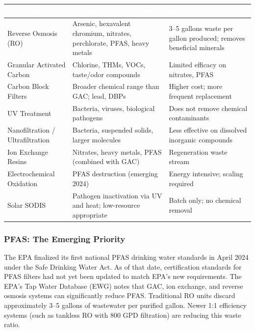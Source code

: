 \documentclass[11pt,letterpaper]{article}
\newcommand{\tableheader}[1]{\textbf{\sffamily\textcolor{white}{#1}}}
\begin{document}
\begin{center}
\begin{tabularx}{\textwidth}{L{3.5cm}XL{3cm}}
\toprule
{}
\tableheader{Technology} & \tableheader{Contaminants Addressed} & \tableheader{Key Limitation} \\
\midrule
Reverse Osmosis (RO) & Arsenic, hexavalent chromium, nitrates, perchlorate, PFAS, heavy metals & 3--5 gallons waste per gallon produced; removes beneficial minerals \\
Granular Activated Carbon & Chlorine, THMs, VOCs, taste/odor compounds & Limited efficacy on nitrates, PFAS \\
Carbon Block Filters & Broader chemical range than GAC; lead, DBPs & Higher cost; more frequent replacement \\
UV Treatment & Bacteria, viruses, biological pathogens & Does not remove chemical contaminants \\
Nanofiltration / Ultrafiltration & Bacteria, suspended solids, larger molecules & Less effective on dissolved inorganic compounds \\
Ion Exchange Resins & Nitrates, heavy metals, PFAS (combined with GAC) & Regeneration waste stream \\
Electrochemical Oxidation & PFAS destruction (emerging 2024) & Energy intensive; scaling required \\
Solar SODIS & Pathogen inactivation via UV and heat; low-resource appropriate & Batch only; no chemical removal \\
\bottomrule
\end{tabularx}
\end{center}

\subsubsection{PFAS: The Emerging Priority}

The EPA finalized its first national PFAS drinking water standards in April 2024 under the Safe Drinking Water Act. As of that date, certification standards for PFAS filters had not yet been updated to match EPA's new requirements. The EPA's Tap Water Database (EWG) notes that GAC, ion exchange, and reverse osmosis systems can significantly reduce PFAS. Traditional RO units discard approximately 3--5 gallons of wastewater per purified gallon. Newer 1:1 efficiency systems (such as tankless RO with 800 GPD filtration) are reducing this waste ratio.
\end{document}
